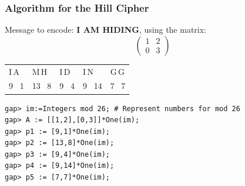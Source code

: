 \documentclass{beamer}
\theoremstyle{definition}
\theoremstyle{remark}
\begin{document}
\begin{frame}
	\frametitle{Algorithm for the Hill Cipher}
	\begin{enumerate}
	\end{enumerate}
\end{frame}
\begin{frame}[fragile]
	Message to encode: \textbf{I AM HIDING}, using the matrix:
	\[ \begin{pmatrix}
	1 & 2 \\
	0 & 3
	\end{pmatrix} \]
	\begin{table}
		\begin{tabular}{lllll}
			I\,A  & M\,H   & I\,D  & I\,N   & G\,G  \\
			9 \, 1 & 13 \, 8 & 9 \, 4 & 9 \, 14 & 7 \, 7 \\
		\end{tabular}
	\end{table}
	
\begin{verbatim}
gap> im:=Integers mod 26; # Represent numbers for mod 26 
gap> A := [[1,2],[0,3]]*One(im);
gap> p1 := [9,1]*One(im);
gap> p2 := [13,8]*One(im);
gap> p3 := [9,4]*One(im);
gap> p4 := [9,14]*One(im);
gap> p5 := [7,7]*One(im);
\end{verbatim}
\end{frame}
\end{document}
